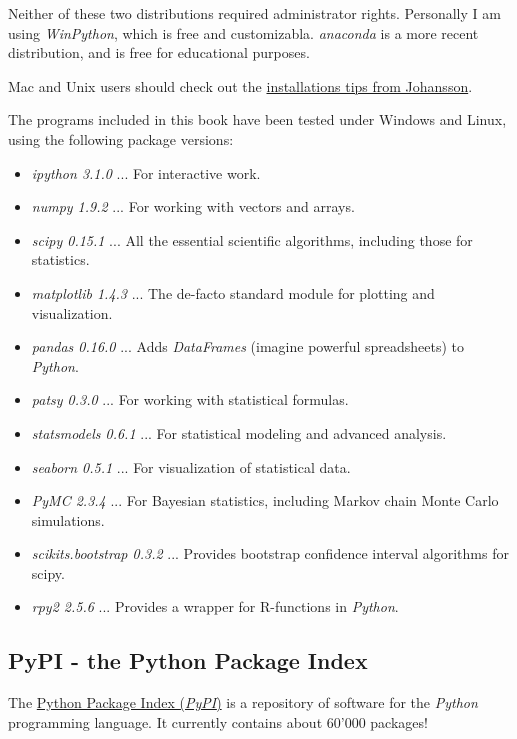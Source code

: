 Neither of these two distributions required administrator rights. Personally I am using \emph{WinPython}, which is free and customizabla. \emph{anaconda} is a more recent distribution, and is free for educational purposes.

Mac and Unix users should check out the \href{https://github.com/jrjohansson/scientific-python-lectures}{installations tips from Johansson}.

The programs included in this book have been tested under Windows and Linux, using the following package versions:

\begin{itemize}
  \item \emph{ipython 3.1.0} ... For interactive work.
  \item \emph{numpy 1.9.2} ... For working with vectors and arrays.
  \item \emph{scipy 0.15.1} ... All the essential scientific algorithms, including those for statistics.
  \item \emph{matplotlib 1.4.3} ... The de-facto standard module for plotting and visualization.
  \item \emph{pandas 0.16.0} ... Adds \emph{DataFrames} (imagine powerful spreadsheets) to \emph{Python}.
  \item \emph{patsy 0.3.0} ... For working with statistical formulas.
  \item \emph{statsmodels 0.6.1} ... For statistical modeling and advanced analysis.
  \item \emph{seaborn 0.5.1} ... For visualization of statistical data.
  \item \emph{PyMC 2.3.4} ... For Bayesian statistics, including Markov chain Monte Carlo simulations.
  \item \emph{scikits.bootstrap 0.3.2} ... Provides bootstrap confidence interval algorithms for scipy.
  \item \emph{rpy2 2.5.6} ... Provides a wrapper for R-functions in \emph{Python}.
\end{itemize}

\subsection{PyPI - the Python Package Index}

The \href{https://pypi.python.org/pypi}{Python Package Index (\emph{PyPI})} is a repository of software for the \emph{Python} programming language. It currently contains about 60'000 packages!

